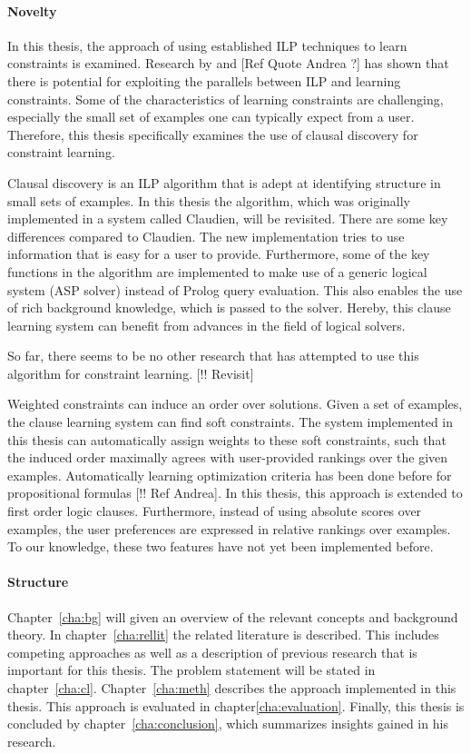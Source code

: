 \paragraph{Novelty}
In this thesis, the approach of using established ILP techniques to learn constraints is examined. Research by \cite{Lallouet:LearningCP} and [Ref Quote Andrea ?] has shown that there is potential for exploiting the parallels between ILP and learning constraints. Some of the characteristics of learning constraints are challenging, especially the small set of examples one can typically expect from a user. Therefore, this thesis specifically examines the use of clausal discovery for constraint learning.

Clausal discovery is an ILP algorithm that is adept at identifying structure in small sets of examples. In this thesis the algorithm, which was originally implemented in a system called Claudien, will be revisited. There are some key differences compared to Claudien. The new implementation tries to use information that is easy for a user to provide. Furthermore, some of the key functions in the algorithm are implemented to make use of a generic logical system (ASP solver) instead of Prolog query evaluation. This also enables the use of rich background knowledge, which is passed to the solver. Hereby, this clause learning system can benefit from advances in the field of logical solvers.

So far, there seems to be no other research that has attempted to use this algorithm for constraint learning. [!! Revisit]

Weighted constraints can induce an order over solutions. Given a set of examples, the clause learning system can find soft constraints. The system implemented in this thesis can automatically assign weights to these soft constraints, such that the induced order maximally agrees with user-provided rankings over the given examples. Automatically learning optimization criteria has been done before for propositional formulas [!! Ref Andrea]. In this thesis, this approach is extended to first order logic clauses. Furthermore, instead of using absolute scores over examples, the user preferences are expressed in relative rankings over examples. To our knowledge, these two features have not yet been implemented before.

\paragraph{Structure}
Chapter~\ref{cha:bg} will given an overview of the relevant concepts and background theory. In chapter~\ref{cha:rellit} the related literature is described. This includes competing approaches as well as a description of previous research that is important for this thesis. The problem statement will be stated in chapter~\ref{cha:cl}. Chapter~\ref{cha:meth} describes the approach implemented in this thesis. This approach is evaluated in chapter\ref{cha:evaluation}. Finally, this thesis is concluded by chapter~\ref{cha:conclusion}, which summarizes insights gained in his research.